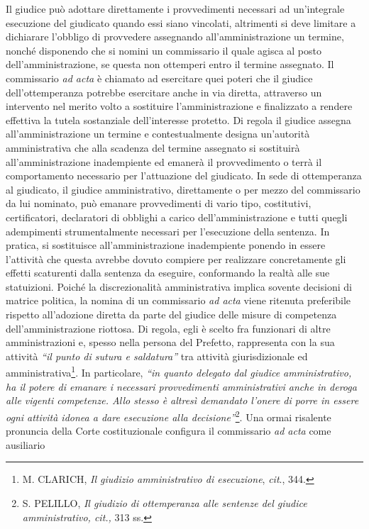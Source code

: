 \documentclass[12pt,it,a4paper,]{report}
\begin{document}
Il giudice può adottare direttamente i provvedimenti necessari ad
un'integrale esecuzione del giudicato quando essi siano vincolati,
altrimenti si deve limitare a dichiarare l'obbligo di provvedere
assegnando all'amministrazione un termine, nonché disponendo che si
nomini un commissario il quale agisca al posto dell'amministrazione, se
questa non ottemperi entro il termine assegnato. Il commissario \emph{ad
acta} è chiamato ad esercitare quei poteri che il giudice
dell'ottemperanza potrebbe esercitare anche in via diretta, attraverso
un intervento nel merito volto a sostituire l'amministrazione e
finalizzato a rendere effettiva la tutela sostanziale dell'interesse
protetto. Di regola il giudice assegna all'amministrazione un termine e
contestualmente designa un'autorità amministrativa che alla scadenza del
termine assegnato si sostituirà all'amministrazione inadempiente ed
emanerà il provvedimento o terrà il comportamento necessario per
l'attuazione del giudicato. In sede di ottemperanza al giudicato, il
giudice amministrativo, direttamente o per mezzo del commissario da lui
nominato, può emanare provvedimenti di vario tipo, costitutivi,
certificatori, declaratori di obblighi a carico dell'amministrazione e
tutti quegli adempimenti strumentalmente necessari per l'esecuzione
della sentenza. In pratica, si sostituisce all'amministrazione
inadempiente ponendo in essere l'attività che questa avrebbe dovuto
compiere per realizzare concretamente gli effetti scaturenti dalla
sentenza da eseguire, conformando la realtà alle sue statuizioni. Poiché
la discrezionalità amministrativa implica sovente decisioni di matrice
politica, la nomina di un commissario \emph{ad acta} viene ritenuta
preferibile rispetto all'adozione diretta da parte del giudice delle
misure di competenza dell'amministrazione riottosa. Di regola, egli è
scelto fra funzionari di altre amministrazioni e, spesso nella persona
del Prefetto, rappresenta con la sua attività \emph{``il punto di sutura
e saldatura''} tra attività giurisdizionale ed
amministrativa\footnote{M. CLARICH, \emph{Il giudizio amministrativo di
  esecuzione}, \emph{cit}., 344.}. In particolare, \emph{``in quanto
delegato dal giudice amministrativo, ha il potere di emanare i necessari
provvedimenti amministrativi anche in deroga alle vigenti competenze.
Allo stesso è altresì demandato l'onere di porre in essere ogni attività
idonea a dare esecuzione alla decisione''}\footnote{S. PELILLO, \emph{Il
  giudizio di ottemperanza alle sentenze del giudice amministrativo,
  cit.,} 313 ss.}. Una ormai risalente pronuncia della Corte
costituzionale configura il commissario \emph{ad acta} come ausiliario
\end{document}
